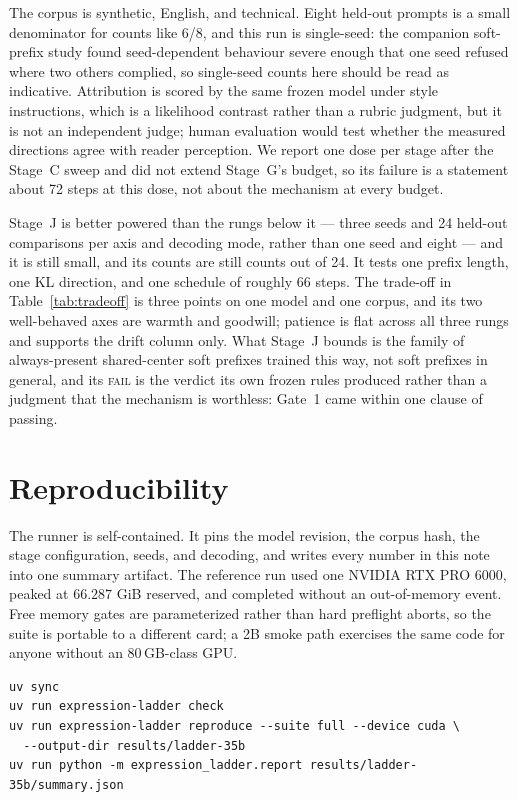 \documentclass[10pt]{article}
\begin{document}
The corpus is synthetic, English, and technical. Eight held-out prompts is a
small denominator for counts like 6/8, and this run is single-seed: the
companion soft-prefix study found seed-dependent behaviour severe enough that
one seed refused where two others complied, so single-seed counts here should be
read as indicative. Attribution is scored by the same frozen model under style
instructions, which is a likelihood contrast rather than a rubric judgment, but
it is not an independent judge; human evaluation would test whether the measured
directions agree with reader perception. We report one dose per stage after the
Stage~C sweep and did not extend Stage~G's budget, so its failure is a statement
about 72 steps at this dose, not about the mechanism at every budget.

Stage~J is better powered than the rungs below it --- three seeds and 24
held-out comparisons per axis and decoding mode, rather than one seed and eight
--- and it is still small, and its counts are still counts out of 24. It tests
one prefix length, one KL direction, and one schedule of roughly 66 steps. The
trade-off in Table~\ref{tab:tradeoff} is three points on one model and one
corpus, and its two well-behaved axes are warmth and goodwill; patience is flat
across all three rungs and supports the drift column only. What Stage~J bounds
is the family of always-present shared-center soft prefixes trained this way,
not soft prefixes in general, and its \textsc{fail} is the verdict its own
frozen rules produced rather than a judgment that the mechanism is worthless:
Gate~1 came within one clause of passing.

\section{Reproducibility}

The runner is self-contained. It pins the model revision, the corpus hash, the
stage configuration, seeds, and decoding, and writes every number in this note
into one summary artifact. The reference run used one NVIDIA RTX PRO 6000, peaked
at $66.287$ GiB reserved, and completed without an out-of-memory event. Free
memory gates are parameterized rather than hard preflight aborts, so the suite is
portable to a different card; a 2B smoke path exercises the same code for anyone
without an 80\,GB-class GPU.

\begin{verbatim}
uv sync
uv run expression-ladder check
uv run expression-ladder reproduce --suite full --device cuda \
  --output-dir results/ladder-35b
uv run python -m expression_ladder.report results/ladder-35b/summary.json
\end{verbatim}
\end{document}
